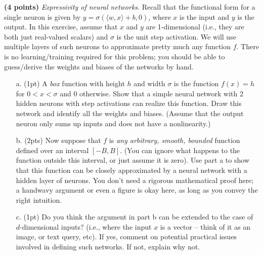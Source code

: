 \noindent {}
\textbf{(4 points)} \textit{Expressivity of neural networks}. Recall that the functional form for a
single neuron is given by $y = \sigma(\langle w, x\rangle + b, 0)$, where $x$ is the input and $y$ is the output. In this exercise, assume that $x$ and $y$ are 1-dimensional (i.e., they are both just real-valued scalars) and $\sigma$ is the unit step activation. We will use multiple layers of such neurons to approximate pretty much any function $f$. There is no learning/training required for this problem; you should be able to guess/derive the weights and biases of the networks by hand.

\begin{enumerate}
    \item[a.] (1pt) A \textit{box} function with height $h$ and width $\sigma$ is the function $f(x) = h$ for $0 < x < \sigma$ and 0 otherwise. Show that a simple neural network with 2 hidden neurons with step activations can realize this function. Draw this network and identify all the weights and biases. (Assume that the output neuron only sums up inputs and does not have a nonlinearity.)
    \item[b.] (2pts) Now suppose that $f$ is \textit{any arbitrary, smooth, bounded} function defined over an interval $[-B, B]$. (You can ignore what happens to the function outside this interval, or just assume it is zero). Use part a to show that this function can be closely approximated by a neural network with a hidden layer of neurons. You don’t need a rigorous mathematical proof here; a handwavy argument or even a figure is okay here, as long as you convey the right intuition.
    \item[c.] (1pt) Do you think the argument in part b can be extended to the case of $d$-dimensional inputs? (i.e., where the input $x$ is a vector – think of it as an image, or text query, etc). If yes, comment on potential practical issues involved in defining such networks. If not, explain why not.
\end{enumerate}

\noindent \myAnswer{}
